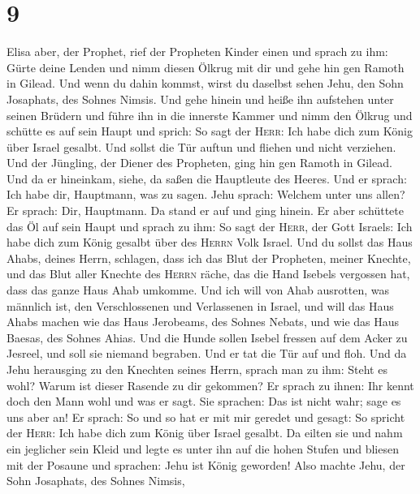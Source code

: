 \hypertarget{section-8}{%
\section{9}\label{section-8}}

 Elisa aber, der Prophet, rief der Propheten Kinder einen
und sprach zu ihm: Gürte deine Lenden und nimm diesen Ölkrug mit dir und
gehe hin gen Ramoth in Gilead.  Und wenn du dahin kommst,
wirst du daselbst sehen Jehu, den Sohn Josaphats, des Sohnes Nimsis. Und
gehe hinein und heiße ihn aufstehen unter seinen Brüdern und führe ihn
in die innerste Kammer  und nimm den Ölkrug und schütte es
auf sein Haupt und sprich: So sagt der \textsc{Herr}: Ich habe dich zum
König über Israel gesalbt. Und sollst die Tür auftun und fliehen und
nicht verziehen.  Und der Jüngling, der Diener des
Propheten, ging hin gen Ramoth in Gilead.  Und da er
hineinkam, siehe, da saßen die Hauptleute des Heeres. Und er sprach: Ich
habe dir, Hauptmann, was zu sagen. Jehu sprach: Welchem unter uns allen?
Er sprach: Dir, Hauptmann.  Da stand er auf und ging
hinein. Er aber schüttete das Öl auf sein Haupt und sprach zu ihm: So
sagt der \textsc{Herr}, der Gott Israels: Ich habe dich zum König
gesalbt über des \textsc{Herrn} Volk Israel.  Und du
sollst das Haus Ahabs, deines Herrn, schlagen, dass ich das Blut der
Propheten, meiner Knechte, und das Blut aller Knechte des \textsc{Herrn}
räche, das die Hand Isebels vergossen hat,  dass das ganze
Haus Ahab umkomme. Und ich will von Ahab ausrotten, was männlich ist,
den Verschlossenen und Verlassenen in Israel,  und will
das Haus Ahabs machen wie das Haus Jerobeams, des Sohnes Nebats, und wie
das Haus Baesas, des Sohnes Ahias.  Und die Hunde sollen
Isebel fressen auf dem Acker zu Jesreel, und soll sie niemand begraben.
Und er tat die Tür auf und floh.  Und da Jehu herausging
zu den Knechten seines Herrn, sprach man zu ihm: Steht es wohl? Warum
ist dieser Rasende zu dir gekommen? Er sprach zu ihnen: Ihr kennt doch
den Mann wohl und was er sagt.  Sie sprachen: Das ist
nicht wahr; sage es uns aber an! Er sprach: So und so hat er mit mir
geredet und gesagt: So spricht der \textsc{Herr}: Ich habe dich zum
König über Israel gesalbt.  Da eilten sie und nahm ein
jeglicher sein Kleid und legte es unter ihn auf die hohen Stufen und
bliesen mit der Posaune und sprachen: Jehu ist König geworden!
 Also machte Jehu, der Sohn Josaphats, des Sohnes Nimsis,
